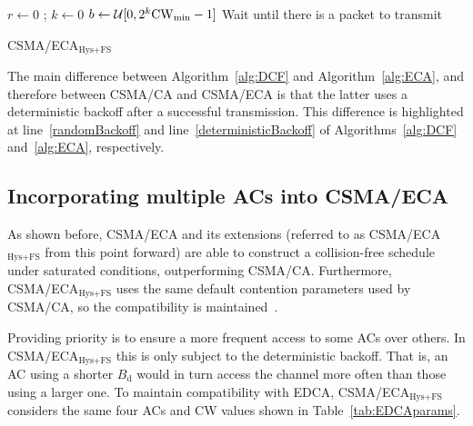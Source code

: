 	\begin{algorithm}[tb]
	{
	  $r \leftarrow 0$ ; $k \leftarrow 0$\;
	  $b \leftarrow \mathcal{U}[0,2^k\rm{CW}_{min}-1]$\;
	  Wait until there is a packet to transmit\;
	}
	\vspace{0.2cm}
	\caption{CSMA/ECA$_{\text{Hys+FS}}$}
	\label{alg:ECA}
	\end{algorithm}

The main difference between Algorithm~\ref{alg:DCF} and Algorithm~\ref{alg:ECA}, and therefore between CSMA/CA and CSMA/ECA is that the latter uses a deterministic backoff after a successful transmission. This difference is highlighted at line~\ref{randomBackoff} and line~\ref{deterministicBackoff} of Algorithms~\ref{alg:DCF} and~\ref{alg:ECA}, respectively.


\subsection{Incorporating multiple ACs into CSMA/ECA}
As shown before, CSMA/ECA and its extensions (referred to as CSMA/ECA$_{\text{Hys+FS}}$ from this point forward) are able to construct a collision-free schedule under saturated conditions, outperforming CSMA/CA. Furthermore, CSMA/ECA$_{\text{Hys+FS}}$ uses the same default contention parameters used by CSMA/CA, so the compatibility is maintained~\cite{sanabria2014high}.

Providing priority is to ensure a more frequent access to some ACs over others. In CSMA/ECA$_{\text{Hys+FS}}$ this is only subject to the deterministic backoff. That is, an AC using a shorter $B_{\text{d}}$ would in turn access the channel more often than those using a larger one. To maintain compatibility with EDCA, CSMA/ECA$_{\text{Hys+FS}}$ considers the same four ACs and CW values shown in Table~\ref{tab:EDCAparams}. 

